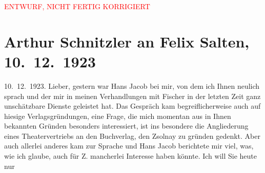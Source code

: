 
\begin{center}
            \textcolor{red}{ENTWURF, NICHT FERTIG KORRIGIERT}
                      \end{center}
            
         
         \renewcommand{\erwaehntePersonen}{Personen: Samuel Fischer, Hans Jacob, Felix Salten, Paul von Zsolnay}
         \renewcommand{\erwaehnteOrte}{Orte: Berlin, Paris, Wien, XVIII., Währing}
         \renewcommand{\erwaehnteWerke}{}
               \section[Arthur Schnitzler an Felix Salten, 10. 12. 1923]{ Arthur Schnitzler an Felix Salten, 10. 12. 1923}\nopagebreak{}\rehead{ }\begin{ledgroupsized}[t]{13cm}\normalsize\beginnumbering \toendnotes[C]{\smallbreak\pagebreak[2]} 
\pstart
           \raggedleft{}{\pb}10. 12. 1923. \pend
           \pstart{}Lieber,\pend\pstart
           gestern war Hans Jacob bei mir, von dem ich
               Ihnen neulich sprach und der mir in meinen Verhandlungen mit Fischer in der letzten Zeit ganz unschätzbare Dienste
               geleistet hat. Das Gespräch kam begreiflicherweise auch auf hiesige
               Verlagsgründungen, eine Frage, die mich momentan aus in Ihnen bekannten Gründen
               besonders interessiert, ist ins besondere die Angliederung eines Theatervertriebs an
               den Buchverlag, den Zsolnay zu gründen gedenkt.
               Aber auch allerlei anderes kam zur Sprache und Hans
                  Jacob berichtete mir viel, was, wie ich glaube, auch für  Z. mancherlei Interesse haben könnte. Ich will Sie heute nur

\end{ledgroupsized}
